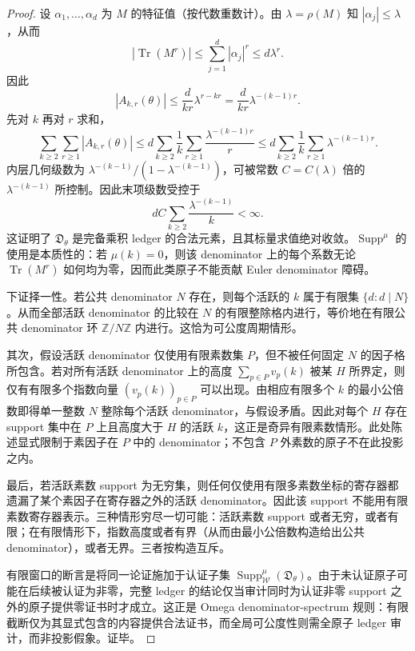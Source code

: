 \begin{proof}
设 \(\alpha_1,\ldots,\alpha_d\) 为 \(M\) 的特征值（按代数重数计）。由 \(\lambda=\rho(M)\) 知 \(|\alpha_j|\le\lambda\)，从而
\[
|\operatorname{Tr}(M^r)|\le\sum_{j=1}^{d}|\alpha_j|^r\le d\lambda^r.
\]
因此
\[
|A_{k,r}(\theta)|
\le \frac{d}{kr}\lambda^{r-kr}
=\frac{d}{kr}\lambda^{-(k-1)r}.
\]
先对 \(k\) 再对 \(r\) 求和，
\[
\sum_{k\ge2}\sum_{r\ge1}|A_{k,r}(\theta)|
\le d\sum_{k\ge2}\frac1k\sum_{r\ge1}\frac{\lambda^{-(k-1)r}}{r}
\le d\sum_{k\ge2}\frac1k\sum_{r\ge1}\lambda^{-(k-1)r}.
\]
内层几何级数为 \(\lambda^{-(k-1)}/(1-\lambda^{-(k-1)})\)，可被常数 \(C=C(\lambda)\) 倍的 \(\lambda^{-(k-1)}\) 所控制。因此末项级数受控于
\[
 dC\sum_{k\ge2}\frac{\lambda^{-(k-1)}}{k}<\infty.
\]
这证明了 \(\mathfrak D_\theta\) 是完备乘积 ledger 的合法元素，且其标量求值绝对收敛。\(\operatorname{Supp}^{\mu}\) 的使用是本质性的：若 \(\mu(k)=0\)，则该 denominator 上的每个系数无论 \(\operatorname{Tr}(M^r)\) 如何均为零，因而此类原子不能贡献 Euler denominator 障碍。

下证择一性。若公共 denominator \(N\) 存在，则每个活跃的 \(k\) 属于有限集 \(\{d:d\mid N\}\)。从而全部活跃 denominator 的比较在 \(N\) 的有限整除格内进行，等价地在有限公共 denominator 环 \(\mathbb Z/N\mathbb Z\) 内进行。这恰为可公度周期情形。

其次，假设活跃 denominator 仅使用有限素数集 \(P\)，但不被任何固定 \(N\) 的因子格所包含。若对所有活跃 denominator 上的高度 \(\sum_{p\in P}v_p(k)\) 被某 \(H\) 所界定，则仅有有限多个指数向量 \((v_p(k))_{p\in P}\) 可以出现。由相应有限多个 \(k\) 的最小公倍数即得单一整数 \(N\) 整除每个活跃 denominator，与假设矛盾。因此对每个 \(H\) 存在 support 集中在 \(P\) 上且高度大于 \(H\) 的活跃 \(k\)，这正是奇异有限素数情形。此处陈述显式限制于素因子在 \(P\) 中的 denominator；不包含 \(P\) 外素数的原子不在此投影之内。

最后，若活跃素数 support 为无穷集，则任何仅使用有限多素数坐标的寄存器都遗漏了某个素因子在寄存器之外的活跃 denominator。因此该 support 不能用有限素数寄存器表示。三种情形穷尽一切可能：活跃素数 support 或者无穷，或者有限；在有限情形下，指数高度或者有界（从而由最小公倍数构造给出公共 denominator），或者无界。三者按构造互斥。

有限窗口的断言是将同一论证施加于认证子集 \(\operatorname{Supp}^{\mu}_{\mathcal W}(\mathfrak D_\theta)\)。由于未认证原子可能在后续被认证为非零，完整 ledger 的结论仅当审计同时为认证非零 support 之外的原子提供零证书时才成立。这正是 Omega denominator-spectrum 规则：有限截断仅为其显式包含的内容提供合法证书，而全局可公度性则需全原子 ledger 审计，而非投影假象。证毕。
\end{proof}


